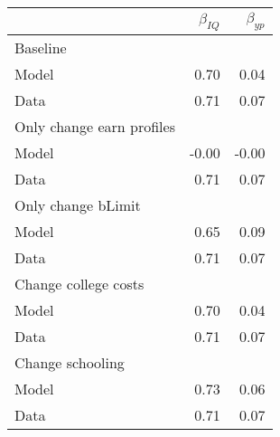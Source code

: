 \begin{tabular}{lrr}
\hline
  & $\beta_{IQ}$  & $\beta_{yp}$  \\ 
\hline
Baseline &   &   \\ 
Model & 0.70  & 0.04  \\ 
Data & 0.71  & 0.07  \\ 
Only change earn profiles &   &   \\ 
Model & -0.00  & -0.00  \\ 
Data & 0.71  & 0.07  \\ 
Only change bLimit &   &   \\ 
Model & 0.65  & 0.09  \\ 
Data & 0.71  & 0.07  \\ 
Change college costs &   &   \\ 
Model & 0.70  & 0.04  \\ 
Data & 0.71  & 0.07  \\ 
Change schooling &   &   \\ 
Model & 0.73  & 0.06  \\ 
Data & 0.71  & 0.07  \\ 
\hline
\end{tabular}%
